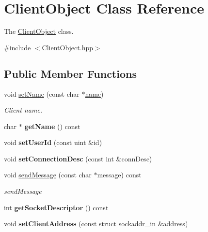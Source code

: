\hypertarget{classClientObject}{}\section{Client\+Object Class Reference}
\label{classClientObject}


The \hyperlink{classClientObject}{Client\+Object} class.  




{\ttfamily \#include $<$Client\+Object.\+hpp$>$}

\subsection*{Public Member Functions}
\begin{DoxyCompactItemize}
\item 
\mbox{\label{classClientObject_ab91f5a41ec123f2d312c7162eda4dff4}} 
void \hyperlink{classClientObject_ab91f5a41ec123f2d312c7162eda4dff4}{set\+Name} (const char $\ast$\hyperlink{classClientObject_a29fa4c21633a35a7321e255e7ac10dbc}{name})
\begin{DoxyCompactList}\small\item\em Client name. \end{DoxyCompactList}\item 
\mbox{\label{classClientObject_a5c4daa9636097bf2905dc53ad08ca81c}} 
char $\ast$ {\bfseries get\+Name} () const
\item 
\mbox{\label{classClientObject_a91713ffa31ed38978f10139dc2ddb81f}} 
void {\bfseries set\+User\+Id} (const uint \&id)
\item 
\mbox{\label{classClientObject_a6cc23f4c8d93b2945399a7c5c0af7501}} 
void {\bfseries set\+Connection\+Desc} (const int \&conn\+Desc)
\item 
void \hyperlink{classClientObject_a4704430f61bd85efd980c6ea083d5374}{send\+Message} (const char $\ast$message) const
\begin{DoxyCompactList}\small\item\em send\+Message \end{DoxyCompactList}\item 
\mbox{\label{classClientObject_a32f1b03ba465cda2796f48a46ef356df}} 
int {\bfseries get\+Socket\+Descriptor} () const
\item 
\mbox{\label{classClientObject_a49c720a1b38e12ebad46f2e9c9cde1b1}} 
void {\bfseries set\+Client\+Address} (const struct sockaddr\+\_\+in \&address)
\end{DoxyCompactItemize}

